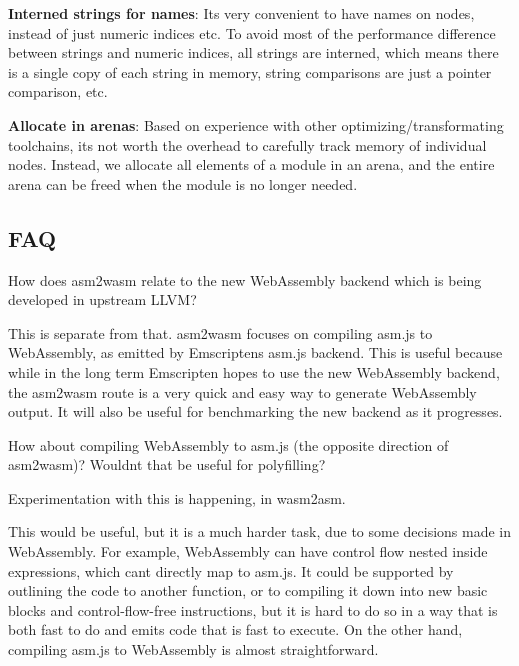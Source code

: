 \begin{DoxyItemize}
\item {\bfseries Interned strings for names}\+: It\textquotesingle{}s very convenient to have names on nodes, instead of just numeric indices etc. To avoid most of the performance difference between strings and numeric indices, all strings are interned, which means there is a single copy of each string in memory, string comparisons are just a pointer comparison, etc.
\item {\bfseries Allocate in arenas}\+: Based on experience with other optimizing/transformating toolchains, it\textquotesingle{}s not worth the overhead to carefully track memory of individual nodes. Instead, we allocate all elements of a module in an arena, and the entire arena can be freed when the module is no longer needed.
\end{DoxyItemize}

\subsection*{F\+AQ}


\begin{DoxyItemize}
\item How does {\ttfamily asm2wasm} relate to the new Web\+Assembly backend which is being developed in upstream L\+L\+VM?
\end{DoxyItemize}

This is separate from that. {\ttfamily asm2wasm} focuses on compiling asm.\+js to Web\+Assembly, as emitted by Emscripten\textquotesingle{}s asm.\+js backend. This is useful because while in the long term Emscripten hopes to use the new Web\+Assembly backend, the {\ttfamily asm2wasm} route is a very quick and easy way to generate Web\+Assembly output. It will also be useful for benchmarking the new backend as it progresses.


\begin{DoxyItemize}
\item How about compiling Web\+Assembly to asm.\+js (the opposite direction of {\ttfamily asm2wasm})? Wouldn\textquotesingle{}t that be useful for polyfilling?
\end{DoxyItemize}

Experimentation with this is happening, in {\ttfamily wasm2asm}.

This would be useful, but it is a much harder task, due to some decisions made in Web\+Assembly. For example, Web\+Assembly can have control flow nested inside expressions, which can\textquotesingle{}t directly map to asm.\+js. It could be supported by outlining the code to another function, or to compiling it down into new basic blocks and control-\/flow-\/free instructions, but it is hard to do so in a way that is both fast to do and emits code that is fast to execute. On the other hand, compiling asm.\+js to Web\+Assembly is almost straightforward.


